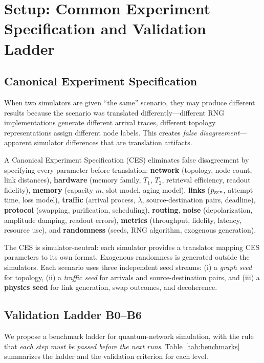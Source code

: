 \documentclass{ams-journal}
\begin{document}
\section{Setup: Common Experiment Specification and Validation Ladder}
\label{sec:setup}

\subsection{Canonical Experiment Specification}

When two simulators are given ``the same'' scenario, they may produce different results because the scenario was translated differently---different RNG implementations generate different arrival traces, different topology representations assign different node labels. This creates \emph{false disagreement}---apparent simulator differences that are translation artifacts.

A Canonical Experiment Specification (CES) eliminates false disagreement by specifying every parameter before translation: \textbf{network} (topology, node count, link distances), \textbf{hardware} (memory family, $T_1$, $T_2$, retrieval efficiency, readout fidelity), \textbf{memory} (capacity $m$, slot model, aging model), \textbf{links} ($p_{\rm gen}$, attempt time, loss model), \textbf{traffic} (arrival process, $\lambda$, source-destination pairs, deadline), \textbf{protocol} (swapping, purification, scheduling), \textbf{routing}, \textbf{noise} (depolarization, amplitude damping, readout errors), \textbf{metrics} (throughput, fidelity, latency, resource use), and \textbf{randomness} (seeds, RNG algorithm, exogenous generation).

The CES is simulator-neutral: each simulator provides a translator mapping CES parameters to its own format. Exogenous randomness is generated outside the simulators. Each scenario uses three independent seed streams: (i) a \emph{graph seed} for topology, (ii) a \emph{traffic seed} for arrivals and source-destination pairs, and (iii) a \textbf{physics seed} for link generation, swap outcomes, and decoherence.

\subsection{Validation Ladder B0--B6}
\label{sec:ladder}

We propose a benchmark ladder for quantum-network simulation, with the rule that \emph{each step must be passed before the next runs}. Table~\ref{tab:benchmarks} summarizes the ladder and the validation criterion for each level.
\end{document}
